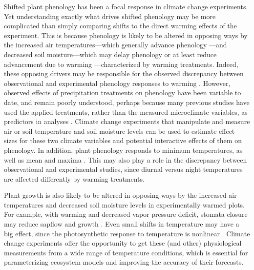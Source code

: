 \documentclass{article}
\begin{document}
\par Shifted plant phenology has been a focal response in climate change experiments. Yet understanding exactly what drives shifted phenology may be more complicated than simply comparing shifts to the direct warming effects of the experiment. This is because phenology is likely to be altered in opposing ways by the increased air temperatures---which generally advance phenology \citep{wolkovich2012}---and decreased soil moisture---which may delay phenology or at least reduce advancement due to warming \citep{penuelas2004,craine2012,matthews2016}---characterized by warming treatments. %
Indeed, these opposing drivers may be responsible for the observed discrepancy between observational and experimental phenology responses to warming \citep{wolkovich2012}. However, observed effects of precipitation treatments on phenology have been variable to date, and remain poorly understood, perhaps because many previous studies have used the applied treatments, rather than the measured microclimate variables, as predictors in analyses \citep[but see][]{morin2010}. Climate change experiments that manipulate and measure air or soil temperature and soil moisture levels can be used to estimate effect sizes for these two climate variables and potential interactive effects of them on phenology. In addition, plant phenology responds to minimum temperatures, as well as mean and maxima \citep{shen2016,fu2016,piao2015}. This may also play a role in the discrepancy between observational and experimental studies, since diurnal versus night temperatures are affected differently by warming treatments\citep{shen2016,matthews2016}. 
\par Plant growth is also likely to be altered in opposing ways by the increased air temperatures and decreased soil moisture levels in experimentally warmed plots. For example, with warming and decreased vapor pressure deficit, stomata closure may reduce sapflow and growth \citep{templer2016}. Even small shifts in temperature may have a big effect, since the photosynthetic response to temperature is nonlinear \citep{berry1980}. Climate change experiments offer the opportunity to get these (and other) physiological measurements from a wide range of temperature conditions, which is essential for parameterizing ecosystem models and improving the accuracy of their forecasts.  %
\end{document}
